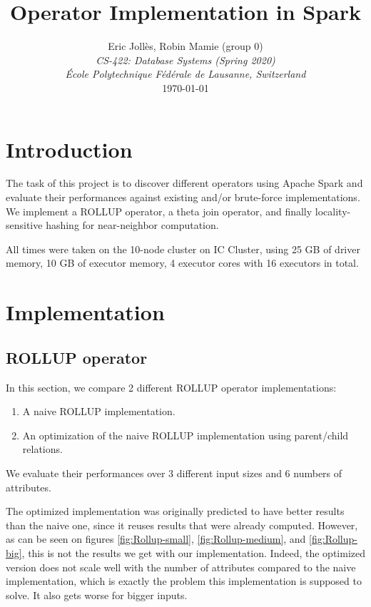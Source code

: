 \documentclass[a4paper,10pt]{IEEEtran}
\title{
    Operator Implementation in Spark
}
\author{
    Eric Jollès, Robin Mamie (group 0)\\
    \textit{CS-422: Database Systems (Spring 2020)}\\
    \textit{École Polytechnique Fédérale de Lausanne, Switzerland}\\
    \today
}
\begin{document}
\maketitle

\section{Introduction}

The task of this project is to discover different operators using Apache Spark and evaluate their performances against existing and/or brute-force implementations.
We implement a ROLLUP operator, a theta join operator, and finally locality-sensitive hashing for near-neighbor computation.

All times were taken on the 10-node cluster on IC Cluster, using 25 GB of driver memory, 10 GB of executor memory, 4 executor cores with 16 executors in total.

\section{Implementation}

\subsection{ROLLUP operator}

In this section, we compare 2 different ROLLUP operator implementations:

\begin{enumerate}
    \item A naive ROLLUP implementation.
    \item An optimization of the naive ROLLUP implementation using parent/child relations.
\end{enumerate}

We evaluate their performances over 3 different input sizes and 6 numbers of attributes.

The optimized implementation was originally predicted to have better results than the naive one, since it reuses results that were already computed.
However, as can be seen on figures \ref{fig:Rollup-small}, \ref{fig:Rollup-medium}, and \ref{fig:Rollup-big}, this is not the results we get with our implementation.
Indeed, the optimized version does not scale well with the number of attributes compared to the naive implementation, which is exactly the problem this implementation is supposed to solve.
It also gets worse for bigger inputs.
\end{document}
